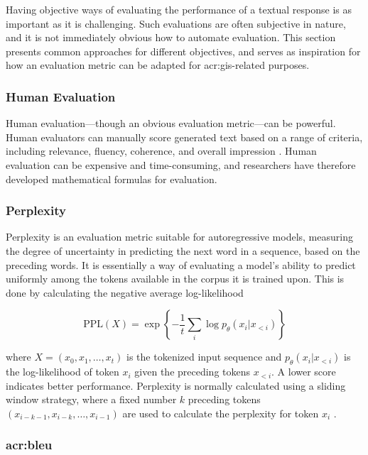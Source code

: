 Having objective ways of evaluating the performance of a textual response is as important as it is challenging. Such evaluations are often subjective in nature, and it is not immediately obvious how to automate evaluation. This section presents common approaches for different objectives, and serves as inspiration for how an evaluation metric can be adapted for \acrshort{acr:gis}-related purposes.

\subsubsection{Human Evaluation}

Human evaluation---though an obvious evaluation metric---can be powerful. Human evaluators can manually score generated text based on a range of criteria, including relevance, fluency, coherence, and overall impression \citep{ceylanLargeLanguageModel2023}. Human evaluation can be expensive and time-consuming, and researchers have therefore developed mathematical formulas for evaluation.

\subsubsection{Perplexity}

Perplexity is an evaluation metric suitable for autoregressive models, measuring the degree of uncertainty in predicting the next word in a sequence, based on the preceding words. It is essentially a way of evaluating a model's ability to predict uniformly among the tokens available in the corpus it is trained upon. This is done by calculating the negative average log-likelihood

\begin{equation}
    \text{PPL}(X) = \exp \left\{ -\frac{1}{t} \sum_{i} \log p_\theta(x_i | x_{<i}) \right\}
    \label{eq:ppl}
\end{equation}

\noindent where $X = (x_0, x_1, \ldots, x_t)$ is the tokenized input sequence and $p_\theta(x_i | x_{<i})$ is the log-likelihood of token $x_i$ given the preceding tokens $x_{<i}$. A lower score indicates better performance. Perplexity is normally calculated using a sliding window strategy, where a fixed number $k$ preceding tokens $(x_{i-k-1},x_{i-k},\ldots,x_{i-1})$ are used to calculate the perplexity for token $x_i$ \citep{huggingfacePerplexityFixedlengthModels}.

\subsubsection[BiLingual Evaluation Understudy (BLEU)]{\acrfull{acr:bleu}}


